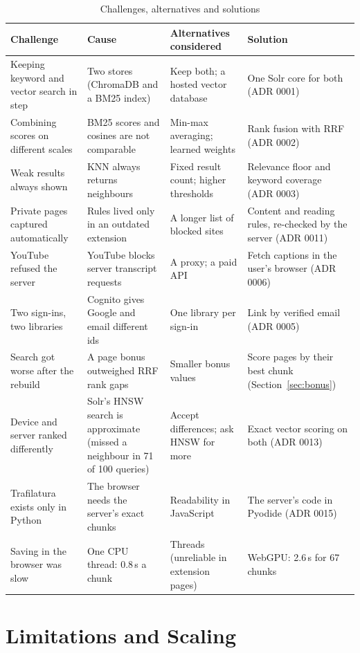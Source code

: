 \begin{table}[H]
\centering
\footnotesize
\begin{tabularx}{\textwidth}{>{\raggedright\arraybackslash}p{} L L L}
\toprule
\textbf{Challenge} & \textbf{Cause} & \textbf{Alternatives considered} & \textbf{Solution} \\
\midrule
Keeping keyword and vector search in step & Two stores (ChromaDB and a BM25 index) & Keep both; a hosted vector database & One Solr core for both (ADR 0001) \\
Combining scores on different scales & BM25 scores and cosines are not comparable & Min-max averaging; learned weights & Rank fusion with RRF (ADR 0002) \\
Weak results always shown & KNN always returns neighbours & Fixed result count; higher thresholds & Relevance floor and keyword coverage (ADR 0003) \\
Private pages captured automatically & Rules lived only in an outdated extension & A longer list of blocked sites & Content and reading rules, re-checked by the server (ADR 0011) \\
YouTube refused the server & YouTube blocks server transcript requests & A proxy; a paid API & Fetch captions in the user's browser (ADR 0006) \\
Two sign-ins, two libraries & Cognito gives Google and email different ids & One library per sign-in & Link by verified email (ADR 0005) \\
Search got worse after the rebuild & A page bonus outweighed RRF rank gaps & Smaller bonus values & Score pages by their best chunk (Section~\ref{sec:bonus}) \\
Device and server ranked differently & Solr's HNSW search is approximate (missed a neighbour in 71 of 100 queries) & Accept differences; ask HNSW for more & Exact vector scoring on both (ADR 0013) \\
Trafilatura exists only in Python & The browser needs the server's exact chunks & Readability in JavaScript & The server's code in Pyodide (ADR 0015) \\
Saving in the browser was slow & One CPU thread: 0.8\,s a chunk & Threads (unreliable in extension pages) & WebGPU: 2.6\,s for 67 chunks \\
\bottomrule
\end{tabularx}
\caption{Challenges, alternatives and solutions}
\label{tab:challenges}
\end{table}

\section{Limitations and Scaling}

